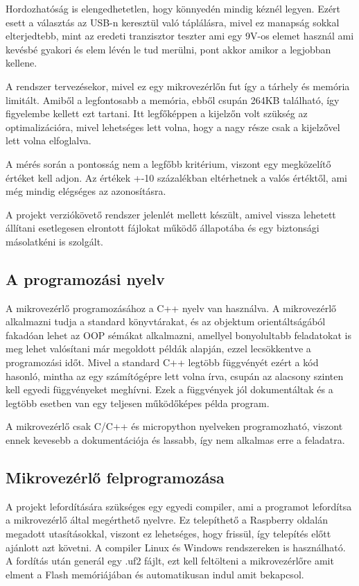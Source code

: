 Hordozhatóság is elengedhetetlen, hogy könnyedén mindig kéznél legyen.
Ezért esett a választás az USB-n keresztül való táplálásra, mivel ez 
manapság sokkal elterjedtebb, mint az eredeti tranzisztor teszter ami egy
9V-os elemet használ ami kevésbé gyakori és elem lévén le tud merülni, pont 
akkor amikor a legjobban kellene.

A rendszer tervezésekor, mivel ez egy mikrovezérlőn fut így a 
tárhely és memória limitált. Amiből a legfontosabb a memória, ebből 
csupán 264KB található, így figyelembe kellett ezt tartani. Itt 
legfőképpen a kijelzőn volt szükség az optimalizációra, mivel 
lehetséges lett volna, hogy a nagy része csak a kijelzővel lett volna elfoglalva.

A mérés során a pontosság nem a legfőbb kritérium, viszont egy megközelítő
értéket kell adjon. Az értékek +-10 százalékban eltérhetnek a valós értéktől, 
ami még mindig elégséges az azonosításra. 

A projekt verziókövető rendszer jelenlét mellett készült, amivel
vissza lehetett állítani esetlegesen elrontott fájlokat működő állapotába
és egy biztonsági másolatkéni is szolgált.


\subsection{A programozási nyelv}

A mikrovezérlő programozásához a C++ nyelv van használva. A mikrovezérlő alkalmazni 
tudja a standard könyvtárakat, és az objektum orientáltságából fakadóan lehet az 
OOP\cite{freeman2008head} sémákat alkalmazni, amellyel bonyolultabb feladatokat is meg lehet valósítani
már megoldott példák alapján, ezzel lecsökkentve a programozási időt.
Mivel a standard C++ legtöbb függvényét ezért a kód hasonló, mintha az egy számítógépre
lett volna írva, csupán az alacsony szinten kell egyedi függvényeket meghívni.
Ezek a függvények jól dokumentáltak és a legtöbb esetben van egy teljesen működőképes
példa program.

A mikrovezérlő csak C/C++ és micropython nyelveken programozható, viszont ennek
kevesebb a dokumentációja és lassabb, így nem alkalmas erre a feladatra.


\subsection{Mikrovezérlő felprogramozása}

A projekt lefordítására szükséges egy egyedi compiler, ami a programot lefordítsa
a mikrovezérlő által megérthető nyelvre. Ez telepíthető a Raspberry oldalán megadott 
utasításokkal, viszont ez lehetséges, hogy frissül, így telepítés előtt ajánlott
azt követni. A compiler Linux és Windows rendszereken is használható. A fordítás után
generál egy .uf2 fájlt, ezt kell feltölteni a mikrovezérlőre amit elment a Flash
memóriájában és automatikusan indul amit bekapcsol.

